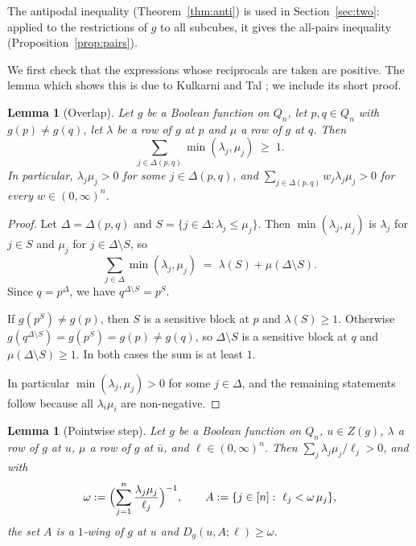 \documentclass[11pt,reqno]{amsart}
\newtheorem{lemma}[theorem]{Lemma}
\theoremstyle{definition}
\theoremstyle{remark}
\numberwithin{equation}{section}
\theoremstyle{named}
\theoremstyle{plain}
\begin{document}
The antipodal inequality (Theorem~\ref{thm:anti}) is used in Section~\ref{sec:two}: applied to the
restrictions of $g$ to all subcubes, it gives the all-pairs inequality (Proposition~\ref{prop:pairs}).

We first check that the expressions whose reciprocals are taken are positive. The lemma which
shows this is due to Kulkarni and Tal \cite[Lemma~6.2]{KT}; we include its short proof.

\begin{lemma}[Overlap]\label{lem:overlap}
Let $g$ be a Boolean function on $Q_n$, let $p,q\in Q_n$ with $g(p)\ne g(q)$, let $\lambda$ be a row
of $g$ at $p$ and $\mu$ a row of $g$ at $q$. Then
\[
   \sum_{j\in\Delta(p,q)}\min(\lambda_j,\mu_j)\;\ge\;1 .
\]
In particular, $\lambda_j\mu_j>0$ for some $j\in\Delta(p,q)$, and
$\sum_{j\in\Delta(p,q)}w_j\lambda_j\mu_j>0$ for every $w\in(0,\infty)^{n}$.
\end{lemma}

\begin{proof}
Let $\Delta=\Delta(p,q)$ and $S=\{j\in\Delta:\lambda_j\le\mu_j\}$. Then $\min(\lambda_j,\mu_j)$ is
$\lambda_j$ for $j\in S$ and $\mu_j$ for $j\in\Delta\setminus S$, so
\[
   \sum_{j\in\Delta}\min(\lambda_j,\mu_j)\;=\;\lambda(S)+\mu(\Delta\setminus S).
\]
Since $q=p^{\Delta}$, we have $q^{\Delta\setminus S}=p^{S}$.

If $g(p^{S})\ne g(p)$,
then $S$ is a sensitive block at $p$ and $\lambda(S)\ge1$. Otherwise
$g(q^{\Delta\setminus S})=g(p^{S})=g(p)\ne g(q)$, so $\Delta\setminus S$ is a sensitive block at $q$
and $\mu(\Delta\setminus S)\ge1$. In both cases the sum is at least $1$.

In particular
$\min(\lambda_j,\mu_j)>0$ for some $j\in\Delta$, and the remaining statements follow because all
$\lambda_i\mu_i$ are non-negative.
\end{proof}

\begin{lemma}[Pointwise step]\label{lem:point}
Let $g$ be a Boolean function on $Q_n$, $u\in Z(g)$, $\lambda$ a row of $g$ at $u$, $\mu$ a row of
$g$ at $\bar u$, and $\ell\in(0,\infty)^{n}$. Then $\sum_{j}\lambda_j\mu_j/\ell_j>0$, and with
\[
   \omega:=\Bigl(\sum_{j=1}^{n}\frac{\lambda_j\mu_j}{\ell_j}\Bigr)^{-1},\qquad
   A:=\{j\in[n]:\ \ell_j<\omega\,\mu_j\},
\]
the set $A$ is a $1$-wing of $g$ at $u$ and $D_g(u,A;\ell)\ge\omega$.
\end{lemma}
\end{document}
